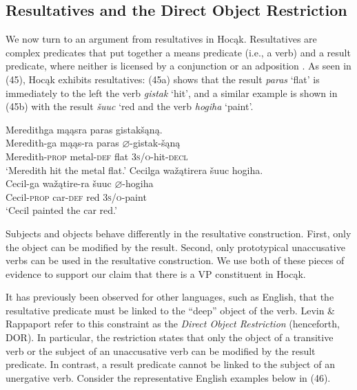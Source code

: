 \documentclass[output=paper]{LSP/langsci}
\begin{document}
\subsection{Resultatives and the Direct Object Restriction}

We now turn to an argument from resultatives in Hocąk. Resultatives are complex predicates that put together a means predicate (i.e., a verb) and a result predicate, where neither is licensed by a conjunction or an adposition \citep[507]{Williams2008}. As seen in (45), Hocąk exhibits resultatives: (45a) shows that the result \textit{paras} `flat' is immediately to the left the verb \textit{gistak} `hit', and a similar example is shown in (45b) with the result \textit{\v{s}uuc} `red and the verb \textit{hogiha} `paint'.

\begin{exe}
\ex
\begin{xlist}
\ex 
\glll Meredithga	mąąsra		paras	gistak\v{s}ąną.\\
Meredith-ga			mąąs-ra	paras	$\varnothing$-gistak-\v{s}ąną \\
	Meredith-\textsc{prop}		metal-\textsc{def}		flat	 \textsc{3s/o}-hit-\textsc{decl} \\
\trans `Meredith hit the metal flat.'
\ex 
\glll Cecilga	wa\v{z}ątirera	 \v{s}uuc	hogiha.\\
Cecil-ga	wa\v{z}ątire-ra \v{s}uuc	$\varnothing$-hogiha \\
	Cecil-\textsc{prop}	car-\textsc{def}	red		\textsc{3s/o}-paint \\
\trans `Cecil painted the car red.'
\end{xlist}
\end{exe}

Subjects and objects behave differently in the resultative construction. First, only the object can be modified by the result. Second, only prototypical unaccusative verbs can be used in the resultative construction. We use both of these pieces of evidence to support our claim that there is a VP constituent in Hocąk.

It has previously been observed for other languages, such as English, that the resultative predicate must be linked to the ``deep'' object of the verb. Levin \& Rappaport \citet{Hovav1995} refer to this constraint as the \textit{Direct Object Restriction} (henceforth, DOR). In particular, the restriction states that only the object of a transitive verb or the subject of an unaccusative verb can be modified by the result predicate. In contrast, a result predicate cannot be linked to the subject of an unergative verb. Consider the representative English examples below in (46).
\end{document}
